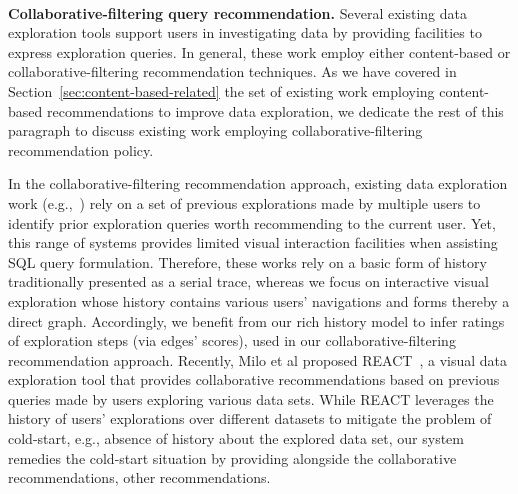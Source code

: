   ~~\\
\noindent \textbf{Collaborative-filtering query recommendation.} 
Several existing data exploration tools support users in investigating data by providing facilities to express exploration queries. 
In general, these work employ either content-based or collaborative-filtering recommendation techniques. 
As we have covered in Section~\ref{sec:content-based-related} the set of existing work employing content-based recommendations to improve data exploration, we dedicate the rest of this paragraph to discuss existing work employing collaborative-filtering recommendation policy. 

In the collaborative-filtering recommendation approach, existing data exploration work (e.g.,~\cite{Eirinaki14,Khoussainova:2010}) rely on a set of previous explorations made by multiple users to identify prior exploration queries worth recommending to the current user. 
Yet, this range of systems provides limited visual interaction facilities when assisting SQL query formulation. Therefore, these works rely on a basic form of history traditionally presented as a serial trace, whereas we focus on interactive visual exploration whose history contains various users' navigations and forms thereby a direct graph. Accordingly, we benefit from our rich history model to infer ratings of exploration steps (via edges' scores), used in our collaborative-filtering recommendation approach.
Recently, Milo et al proposed REACT~\cite{Milo:2016,Milo:2018}, a visual data exploration tool that provides collaborative recommendations based on previous queries made by users exploring various data sets. 
While REACT leverages the history of users' explorations over different datasets to mitigate the problem of cold-start, e.g., absence of history about the explored data set, our system \prototype{}  remedies the cold-start situation by providing alongside the collaborative recommendations,  other recommendations.



